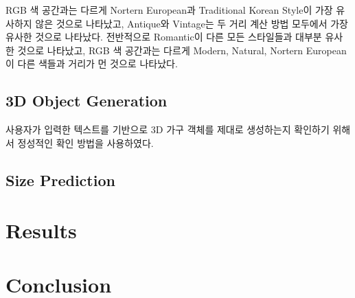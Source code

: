 \documentclass[11pt]{article}
\begin{document}
RGB 색 공간과는 다르게 Nortern European과 Traditional Korean Style이 가장 유사하지 않은 것으로 나타났고, Antique와 Vintage는 두 거리 계산 방법 모두에서 가장 유사한 것으로 나타났다.
전반적으로 Romantic이 다른 모든 스타일들과 대부분 유사한 것으로 나타났고, RGB 색 공간과는 다르게 Modern, Natural, Nortern European이 다른 색들과 거리가 먼 것으로 나타났다.

\subsection{3D Object Generation}
사용자가 입력한 텍스트를 기반으로 3D 가구 객체를 제대로 생성하는지 확인하기 위해서 정성적인 확인 방법을 사용하였다. 

\subsection{Size Prediction}

\section{Results}

\section{Conclusion}



\end{document}
